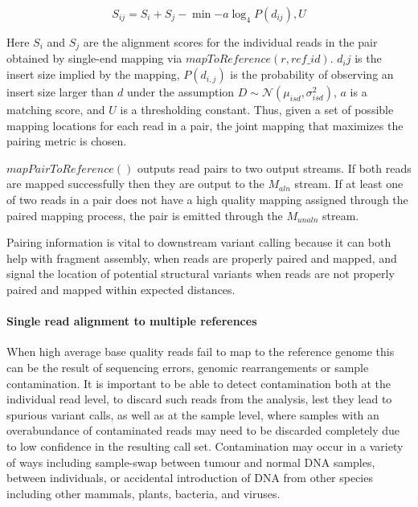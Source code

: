 \begin{equation}
    S_{ij}=S_i + S_j - \min{-a\log_4P(d_{ij}),U}
\end{equation}

Here $S_i$ and $S_j$ are the alignment scores for the individual reads in the pair obtained by single-end mapping via $mapToReference(r, ref\_id)$. $d_ij$ is the insert size implied by the mapping, $P(d_{i,j})$ is the probability of observing an insert size larger than $d$ under the assumption $D \sim \mathcal{N}(\mu_{isd}, \sigma_{isd}^2)$, $a$ is a matching score, and $U$ is a thresholding constant. Thus, given a set of possible mapping locations for each read in a pair, the joint mapping that maximizes the pairing metric is chosen.

$mapPairToReference()$ outputs read pairs to two output streams. If both reads are mapped successfully then they are output to the $M_{aln}$ stream. If at least one of two reads in a pair does not have a high quality mapping assigned through the paired mapping process, the pair is emitted through the $M_{unaln}$ stream.

Pairing information is vital to downstream variant calling because it can both help with fragment assembly, when reads are properly paired and mapped, and signal the location of potential structural variants when reads are not properly paired and mapped within expected distances.

\paragraph{Single read alignment to multiple references}
When high average base quality reads fail to map to the reference genome this can be the result of sequencing errors, genomic rearrangements or sample contamination. It is important to be able to detect contamination both at the individual read level, to discard such reads from the analysis, lest they lead to spurious variant calls, as well as at the sample level, where samples with an overabundance of contaminated reads may need to be discarded completely due to low confidence in the resulting call set. Contamination may occur in a variety of ways including sample-swap between tumour and normal DNA samples, between individuals, or accidental introduction of DNA from other species including other mammals, plants, bacteria, and viruses. 

